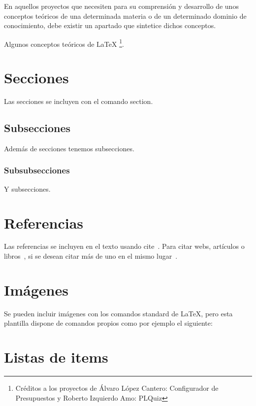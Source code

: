
En aquellos proyectos que necesiten para su comprensión y desarrollo de unos conceptos teóricos de una determinada materia o de un determinado dominio de conocimiento, debe existir un apartado que sintetice dichos conceptos.

Algunos conceptos teóricos de \LaTeX{} \footnote{Créditos a los proyectos de Álvaro López Cantero: Configurador de Presupuestos y Roberto Izquierdo Amo: PLQuiz}.

\section{Secciones}

Las secciones se incluyen con el comando section.

\subsection{Subsecciones}

Además de secciones tenemos subsecciones.

\subsubsection{Subsubsecciones}

Y subsecciones. 


\section{Referencias}

Las referencias se incluyen en el texto usando cite~\cite{wiki:latex}. Para citar webs, artículos o libros~\cite{koza92}, si se desean citar más de uno en el mismo lugar~\cite{bortolot2005, koza92}.


\section{Imágenes}

Se pueden incluir imágenes con los comandos standard de \LaTeX, pero esta plantilla dispone de comandos propios como por ejemplo el siguiente:




\section{Listas de items}

